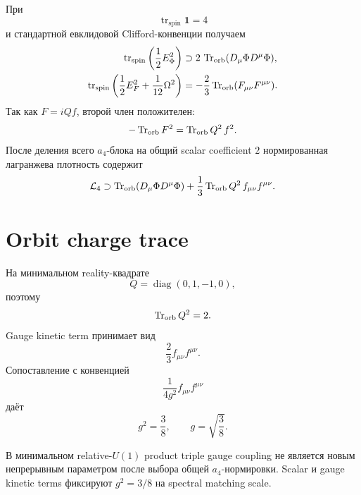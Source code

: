 При
\begin{equation}
 \operatorname{tr}_{\mathrm{spin}}\mathbf1=4
\end{equation}
и стандартной евклидовой Clifford-конвенции получаем
\begin{align}
 \operatorname{tr}_{\mathrm{spin}}
 \left(\frac12E_\Phi^2\right)
 &\supset
 2\,\operatorname{Tr}_{\mathrm{orb}}(D_\mu\Phi D^\mu\Phi),
 \\
 \operatorname{tr}_{\mathrm{spin}}
 \left(
 \frac12E_F^2+\frac1{12}\Omega^2
 \right)
 &=
 -\frac23\operatorname{Tr}_{\mathrm{orb}}(F_{\mu\nu}F^{\mu\nu}).
\end{align}
Так как \(F=iQf\), второй член положителен:
\begin{equation}
 -\operatorname{Tr}_{\mathrm{orb}}F^2
 =\operatorname{Tr}_{\mathrm{orb}}Q^2\,f^2.
\end{equation}
После деления всего \(a_4\)-блока на общий scalar coefficient \(2\)
нормированная лагранжева плотность содержит
\begin{equation}
 \mathcal L_4
 \supset
 \operatorname{Tr}_{\mathrm{orb}}(D_\mu\Phi D^\mu\Phi)
 +\frac13\operatorname{Tr}_{\mathrm{orb}}Q^2\,
 f_{\mu\nu}f^{\mu\nu}.
\end{equation}

\section{Orbit charge trace}

На минимальном reality-квадрате
\begin{equation}
 Q=\operatorname{diag}(0,1,-1,0),
\end{equation}
поэтому
\begin{equation}
 \operatorname{Tr}_{\mathrm{orb}}Q^2=2.
\end{equation}
Gauge kinetic term принимает вид
\begin{equation}
 \frac23 f_{\mu\nu}f^{\mu\nu}.
\end{equation}
Сопоставление с конвенцией
\begin{equation}
 \frac1{4g^2}f_{\mu\nu}f^{\mu\nu}
\end{equation}
даёт
\begin{equation}
 \boxed{g^2=\frac38,}
 \qquad
 \boxed{g=\sqrt{\frac38}.}
\end{equation}

\begin{theorem}
В минимальном relative-\(U(1)\) product triple gauge coupling не является
новым непрерывным параметром после выбора общей \(a_4\)-нормировки.
Scalar и gauge kinetic terms фиксируют
\(g^2=3/8\) на spectral matching scale.
\end{theorem}

